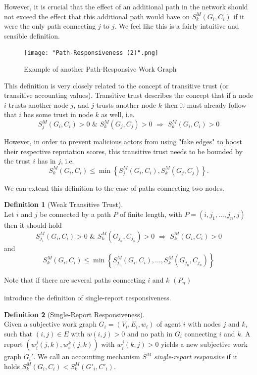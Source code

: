 \documentclass[11pt,a4paper]{article}
\theoremstyle{definition}
\newtheorem{definition}{Definition}[section]
\theoremstyle{theorem}
\theoremstyle{proposition}
\theoremstyle{corollary}
\theoremstyle{lemma}
\theoremstyle{example}
\theoremstyle{remark}
\begin{document}
\noindent{}However, it is crucial that the effect of an additional path in the network should not exceed the effect that this additional path would have on $S^M_k(G_i,C_i)$ if it were the only path connecting $j$ to $j$. We feel like this is a fairly intuitive and sensible definition. \vspace{1em}\\

\begin{figure}[H]
\begin{center}
\texttt{[image: "Path-Responsiveness (2)".png]}
\caption{Example of another Path-Responsive Work Graph}
\label{fig:Example of another Path-Responsive Work Graph}
\end{center}
\end{figure}

\noindent{}This definition is very closely related to the concept of transitive trust (or transitive accounting values). Transitive trust describes the concept that if a node $i$ trusts another node $j$, and $j$ trusts another node $k$ then it must already follow that $i$ has some trust in node $k$ as well, i.e. 
\[
S^M_j(G_i,C_i)>0\,\,\&\,\,S^M_k(G_j,C_j)>0\,\,\Rightarrow\,\,S^M_k(G_i,C_i)>0
\]

\noindent{}However, in order to prevent malicious actors from using "fake edges" to boost their respective reputation scores, this transitive trust needs to be bounded by the trust $i$ has in $j$, i.e.
\[
S^M_k(G_i,C_i)\leq\min\left\lbrace{}S^M_j(G_i,C_i), S^M_k(G_j,C_j)\right\rbrace .
\] 

\noindent{}We can extend this definition to the case of paths connecting two nodes.
\begin{definition}[Weak Transitive Trust]\ \\
Let $i$ and $j$ be connected by a path $P$ of finite length, with $P=(i,j_1,\ldots,j_n,j)$ then it should hold 
\[
S^M_{j_1}(G_i,C_i)>0\,\,\&\,\,S^M_k(G_{j_n},C_{j_n})>0\,\,\Rightarrow\,\,S^M_k(G_i,C_i)>0
\]
\noindent{}and
\[
S^M_k(G_i,C_i)\leq\min\left\lbrace{}S^M_{j_1}(G_i,C_i),\ldots,S^M_{k}(G_{j_n},C_{j_n})\right\rbrace
\]

\noindent{}Note that if there are several paths connecting $i$ and $k$ $(P_n)_{}$
\end{definition}



\noindent{}\cite{On the Sybil-Proofness of Accounting Mechanisms} introduce the definition of single-report responsiveness. 

\begin{definition}[Single-Report Responsiveness]\ \\
Given a subjective work graph $G_i=(V_i,E_i,w_i)$ of agent $i$ with nodes $j$ and $k$, such that $(i,j)\in{}E$ with $w(i,j)>0$ and no path in $G_i$ connecting $i$ and $k$. A report $(w^j_i(j,k),w^k_i(j,k))$ with $w^j_i(k,j)>0$ yields a new subjective work graph $G_i'$. We call an accounting mechanism $S^M$ {\it single-report responsive} if it holds $S^M_k(G_i,C_i)<S^M_k(G'_i,C'_i)$. 
\end{definition}
\end{document}
